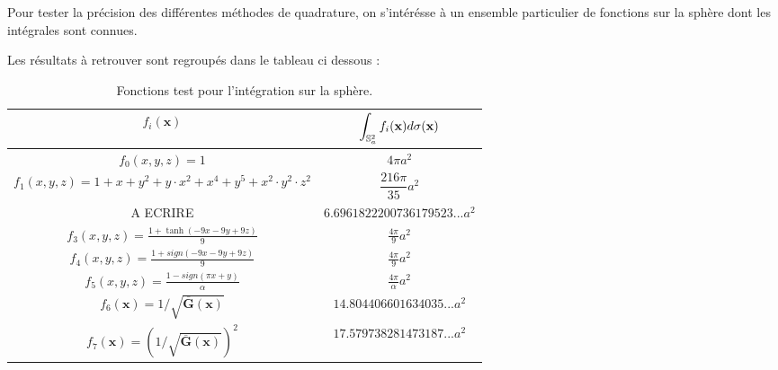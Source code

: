 Pour tester la précision des différentes méthodes de quadrature, on s'intérésse à un ensemble particulier de fonctions sur la sphère dont les intégrales sont connues.

Les résultats à retrouver sont regroupés dans le tableau ci dessous :

\begin{table}[ht]
\begin{center}
\begin{tabular}{|c|c|}
\hline
$f_i(\mathbf{x})$   &   $\displaystyle\int_{\mathbb{S}_a^2} f_i(\mathbf{x}) d\sigma (\mathbf{x})$ \\
\hline
\hline
$f_0(x,y,z)=1$ & $4 \pi a^2$ \\
\hline
$f_1(x,y,z)=1+x+y^2+y\cdot x^2+x^4+y^5+x^2 \cdot y^2 \cdot z^2$ & $\dfrac{216 \pi}{35} a^2$ \\
\hline
A ECRIRE & $6.6961822200736179523...  a^2$ \\
\hline
$f_3(x,y,z)=\frac{1+\tanh(-9x-9y+9z)}{9}$ & $\frac{4\pi}{9} a^2$\\
\hline
$f_4(x,y,z)=\frac{1+sign(-9x-9y+9z)}{9}$ & $\frac{4\pi}{9} a^2$\\
\hline
$f_5(x,y,z)=\frac{1-sign(\pi x + y)}{\alpha}$ & $\frac{4\pi}{\alpha} a^2$ \\
\hline
$f_6(\mathbf{x}) = 1/\sqrt{\overline{\mathbf{G}}(\mathbf{x})}$ & $14.804406601634035... a^2$ \\
\hline
$f_7(\mathbf{x}) = (1/\sqrt{\overline{\mathbf{G}}(\mathbf{x})})^2$ & $17.579738281473187... a^2$ \\
\hline
\end{tabular}
\end{center}
\caption{Fonctions test pour l'intégration sur la sphère.}
\end{table}



























